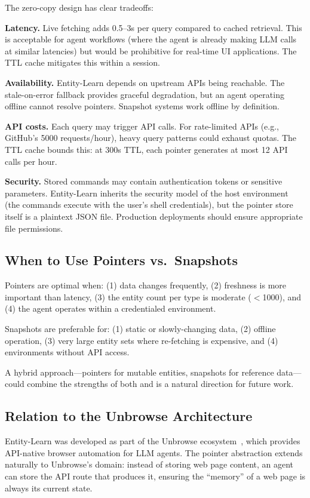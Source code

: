 \documentclass[11pt,twocolumn]{article}
\begin{document}
The zero-copy design has clear tradeoffs:

\textbf{Latency.} Live fetching adds 0.5--3s per query compared to cached retrieval. This is acceptable for agent workflows (where the agent is already making LLM calls at similar latencies) but would be prohibitive for real-time UI applications. The TTL cache mitigates this within a session.

\textbf{Availability.} Entity-Learn depends on upstream APIs being reachable. The stale-on-error fallback provides graceful degradation, but an agent operating offline cannot resolve pointers. Snapshot systems work offline by definition.

\textbf{API costs.} Each query may trigger API calls. For rate-limited APIs (e.g., GitHub's 5000 requests/hour), heavy query patterns could exhaust quotas. The TTL cache bounds this: at 300s TTL, each pointer generates at most 12 API calls per hour.

\textbf{Security.} Stored commands may contain authentication tokens or sensitive parameters. Entity-Learn inherits the security model of the host environment (the commands execute with the user's shell credentials), but the pointer store itself is a plaintext JSON file. Production deployments should ensure appropriate file permissions.

\subsection{When to Use Pointers vs.\ Snapshots}

Pointers are optimal when:
(1) data changes frequently,
(2) freshness is more important than latency,
(3) the entity count per type is moderate ($<$1000), and
(4) the agent operates within a credentialed environment.

Snapshots are preferable for:
(1) static or slowly-changing data,
(2) offline operation,
(3) very large entity sets where re-fetching is expensive, and
(4) environments without API access.

A hybrid approach---pointers for mutable entities, snapshots for reference data---could combine the strengths of both and is a natural direction for future work.

\subsection{Relation to the Unbrowse Architecture}

Entity-Learn was developed as part of the Unbrowse ecosystem~\cite{unbrowse2025}, which provides API-native browser automation for LLM agents.
The pointer abstraction extends naturally to Unbrowse's domain: instead of storing web page content, an agent can store the API route that produces it, ensuring the ``memory'' of a web page is always its current state.
\end{document}
